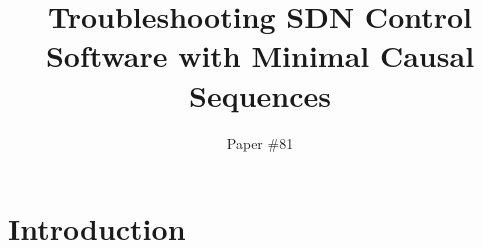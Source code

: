 \documentclass{sig-alternate-10pt}
\begin{document}
\title{Troubleshooting SDN Control Software with Minimal Causal Sequences}


\author{Paper \#81}


   \date{}
   \maketitle
   \thispagestyle{empty}

%

\abstract{{\it }}

\section{Introduction}
\label{sec:intro}

\end{document}
